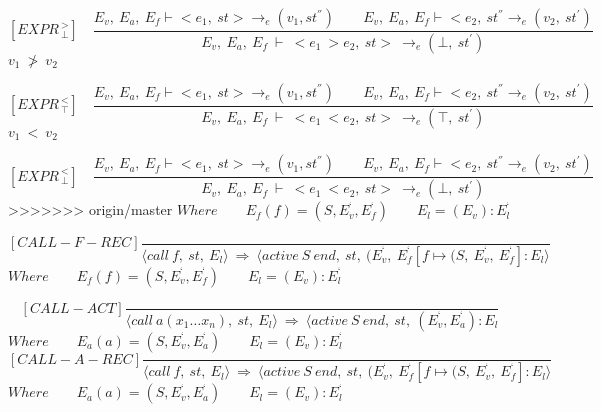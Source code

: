    	\newcommand{\exprtrans}[5][E_v, E_a,E_f]{#1\vdash \langle #2, #3 \rangle \mathrel{\to_e} (#4 , #5)}
   	
   	\[
   	[EXPR^{\ >}_{\ \bot}] \quad
   	\dfrac{E_v, \ E_a, \ E_f \vdash <e_1, \ st> \rightarrow_e (v_1, st^{''}) \qquad E_v, \ E_a, \ E_f \vdash <e_2, \ st^{''} \rightarrow_e (v_2, \ st^{'})}{E_v, \ E_a, \ E_f \ \vdash \ <e_1 \ > e_2, \ st> \ \rightarrow_e (\bot, \ st^{'})}
   	\]
	\begin{math}
   	v_1 \ \not> \ v_2
   	\end{math}   
   	
   	\[
   	[EXPR^{\ <}_{\ \top}] \quad
   	\dfrac{E_v, \ E_a, \ E_f \vdash <e_1, \ st> \rightarrow_e (v_1, st^{''}) \qquad E_v, \ E_a, \ E_f \vdash <e_2, \ st^{''} \rightarrow_e (v_2, \ st^{'})}{E_v, \ E_a, \ E_f \ \vdash \ <e_1 \ < e_2, \ st> \ \rightarrow_e (\top, \ st^{'})}
   	\]
	\begin{math}
   	v_1 \ < \ v_2
   	\end{math}   	
   	

   	\[
   	[EXPR^{\ <}_{\ \bot}] \quad
   	\dfrac{E_v, \ E_a, \ E_f \vdash <e_1, \ st> \rightarrow_e (v_1, st^{''}) \qquad E_v, \ E_a, \ E_f \vdash <e_2, \ st^{''} \rightarrow_e (v_2, \ st^{'})}{E_v, \ E_a, \ E_f \ \vdash \ <e_1 \ < e_2, \ st> \ \rightarrow_e (\bot, \ st^{'})}
   	\]
>>>>>>> origin/master
	\begin{math}
	Where 
	\qquad E_f(f) = (S, E_v^{‘}, E_f^{‘})
	\qquad E_l = (E_v) : E_l^{‘}
	\end{math}
	
	\[
	[CALL-F-REC]
	\dfrac{}{ \langle call \ f, \ st, \ E_l \rangle \ \Rightarrow \ \langle active \ S \ end, \ st, \ (E_v^{‘}, \ E_f^{‘}[f \mapsto (S, \ E_v^{‘}, \ E_f^{‘}] : E_l \rangle}
	\]
	\begin{math}
		Where
		\qquad E_f(f) = (S, E_v^{‘}, E_f^{‘}) 
		\qquad E_l = (E_v) : E_l^{‘}
	\end{math}
	
	\[
	[CALL-ACT]
	\dfrac{}{ \langle call \ a(x_1 … x_n), \ st, \ E_l \rangle \ \Rightarrow \ \langle active \ S \ end, \ st, \ (E_v^{‘}, E_a^{‘}) : E_l}
	\]
	\begin{math}
	Where
	\qquad E_a(a) = (S, E_v^{‘}, E_a^{‘})
	\qquad E_l = (E_v) : E_l^{‘}
	\end{math}
	\[
	[CALL-A-REC]
	\dfrac{}{ \langle call \ f, \ st, \ E_l \rangle \ \Rightarrow \ \langle active \ S \ end, \ st, \ (E_v^{‘}, \ E_f^{‘}[f \mapsto (S, \ E_v^{‘}, \ E_f^{‘}] : E_l \rangle}
	\]
	\begin{math}
		Where
		\qquad E_a(a) = (S, E_v^{‘}, E_a^{‘})
		\qquad E_l = (E_v) : E_l^{‘}		
	\end{math}
	
